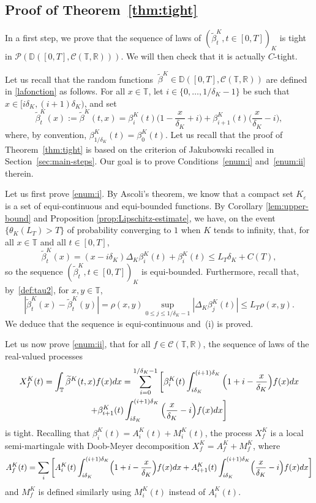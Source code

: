 \documentclass[10pt]{amsart}
\let\cal\mathcal
\let\f\frac
\theoremstyle{plain}
\theoremstyle{remark}
\newcommand{\Co}{\mathcal{C}}
\newcommand\T{\mathbb{T}}
\begin{document}
\subsection{Proof of Theorem~\ref{thm:tight}}
\label{sec:tight}

In a first step, we prove that the sequence of laws of $(\tilde \beta^K_{t}, t\in[0,T])_{K}$ is tight in ${\cal P}(\mathbb{D}([0,T], \Co(\T,\mathbb{R})))$. We will then check that it is actually $C$-tight.

Let us recall that the random functions $\ \tilde \beta^K\in\mathbb{D}([0,T], \Co(\T,\mathbb{R}))$ are defined in \eqref{lafonction} as follows. For all $x\in\T$, let $i\in\{0,\ldots,1/\delta_K-1\}$ be such that $x\in [i\delta_K,(i+1)\delta_K)$, and set
\[
\widetilde \beta^K_{t}(x):=\widetilde \beta^K(t,x) =\beta_i^K(t)\Big(1-\f {x}{\delta_K}+i\Big)+\beta_{i+1}^K(t)\Big(\f {x}{\delta_K}-i\Big),
\]
where, by convention, $\beta^K_{1/\delta_K}(t)=\beta^K_0(t)$.
Let us recall that the proof of Theorem~\ref{thm:tight} is based on the criterion of Jakubowski \cite{jakubowski} recalled in Section~\ref{sec:main-steps}. Our goal is to prove Conditions~\eqref{enum:i} and~\eqref{enum:ii} therein.

Let us first prove \eqref{enum:i}. By Ascoli's theorem, we know that a compact set $K_{\varepsilon}$ is a set of equi-continuous and equi-bounded functions. By Corollary \ref{lem:upper-bound} and Proposition \ref{prop:Lipschitz-estimate}, we have, on the event $\{\theta_K(L_T)>T\}$ of probability converging to $1$ when $K$ tends to infinity,
that, for all $x\in\T$ and all $t\in[0,T]$,
\[\widetilde \beta^K_{t}(x) =(x-i\delta_K)\Delta_K\beta^K_i(t) + \beta_{i}^K(t) \leq L_T\delta_K +C(T),\]
so the sequence $(\widetilde \beta^K_{t}, t\in[0,T])_{K}$ is equi-bounded.
Furthermore, recall that, by~\eqref{def:tau2}, for $x,y\in\T$,
\[\left|\widetilde \beta^K_{t}(x)-\widetilde \beta^K_{t}(y)\right|= \rho(x,y)\sup_{0\leq j\leq 1/\delta_K-1}\left|\Delta_K\beta^K_j(t)\right|
\leq L_T \rho(x,y).\]
We deduce that the sequence is equi-continuous and~(i) is proved.

Let us now prove \eqref{enum:ii}, \ie that for all
$f\in \Co(\T,\mathbb{R})$, the sequence of laws of the real-valued processes
\begin{multline*}
X^K_f(t)= \int_\T \widetilde \beta^K(t,x) f(x) dx =\sum_{i=0}^{1/\delta_K-1} \bigg[\beta^K_{i}(t) \int_{i\delta_{K}}^{(i+1)\delta_{K}} \Big(1+i -{x\over \delta_{K}} \Big)f(x)dx \\
+\beta^K_{i+1}(t) \int_{i\delta_{K}}^{(i+1)\delta_{K}} \Big({x\over \delta_{K}}-i\Big) f(x)dx \bigg]
\end{multline*}
is tight. Recalling that $\beta_{i}^K(t)= A^K_{i}(t) + M^K_{i}(t)$, the process $X^K_f$ is a local semi-martingale with Doob-Meyer decomposition
$X^K_{f} = A^K_{f} + M^K_{f} $, where
\[
A^K_{f} (t) = \sum_{i} \bigg[A^K_{i}(t) \int_{i\delta_{K}}^{(i+1)\delta_{K}} \Bigl(1+i -{x\over \delta_{K}}\Bigr)f(x)dx +A^K_{i+1}(t) \int_{i\delta_{K}}^{(i+1)\delta_{K}} \Bigl({x\over \delta_{K}}-i\Bigr) f(x)dx \bigg]
\]
and $M^K_f$ is defined similarly using $M^K_i(t)$ instead of $A^K_i(t)$.
\end{document}
